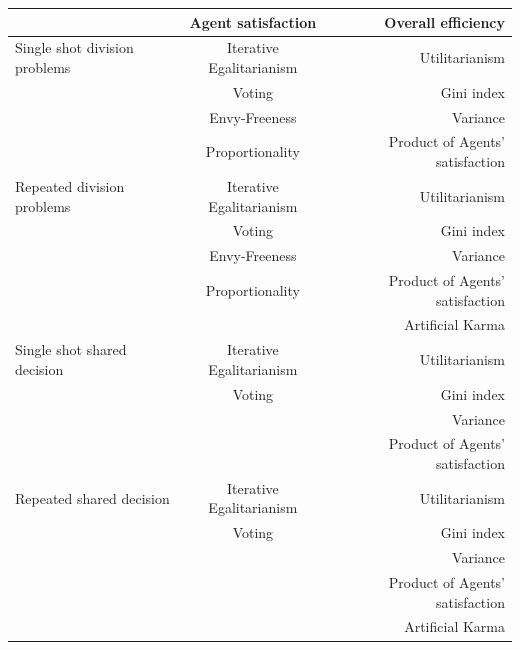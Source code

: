 \documentclass[german, a4paper, 11pt, oneside]{scrbook}
\begin{document}
\begin{center}
\begin{tabular}[h]{l|c|r}
 & Agent satisfaction & Overall efficiency \\
\hline
Single shot division problems & Iterative Egalitarianism & Utilitarianism \\
 & Voting & Gini index \\
 & Envy-Freeness & Variance \\
 & Proportionality & Product of Agents' satisfaction \\
\hline
Repeated division problems & Iterative Egalitarianism & Utilitarianism \\
 & Voting & Gini index \\
 & Envy-Freeness & Variance \\
& Proportionality & Product of Agents' satisfaction\\
& & Artificial Karma\\
\hline
Single shot shared decision & Iterative Egalitarianism & Utilitarianism \\
 & Voting & Gini index \\
  & & Variance \\
& & Product of Agents' satisfaction\\

\hline
Repeated shared decision & Iterative Egalitarianism & Utilitarianism \\
 & Voting & Gini index \\
 &  & Variance \\
& & Product of Agents' satisfaction\\
& & Artificial Karma
\end{tabular}
\end{center}
\end{document}
